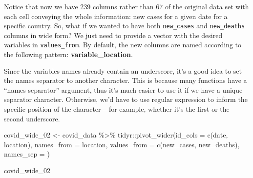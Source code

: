 \documentclass[
]{book}
\newenvironment{Shaded}{\begin{snugshade}}{\end{snugshade}}
\newcommand{\AttributeTok}[1]{\textcolor[rgb]{0.77,0.63,0.00}{#1}}
\newcommand{\FunctionTok}[1]{\textcolor[rgb]{0.00,0.00,0.00}{#1}}
\newcommand{\NormalTok}[1]{#1}
\newcommand{\OtherTok}[1]{\textcolor[rgb]{0.56,0.35,0.01}{#1}}
\newcommand{\SpecialCharTok}[1]{\textcolor[rgb]{0.00,0.00,0.00}{#1}}
\newcommand{\StringTok}[1]{\textcolor[rgb]{0.31,0.60,0.02}{#1}}
\begin{document}
Notice that now we have 239 columns rather than 67 of the original data set with each cell conveying the whole information: new cases for a given date for a specific country. So, what if we wanted to have both \texttt{new\_cases} and \texttt{new\_deaths} columns in wide form? We just need to provide a vector with the desired variables in \texttt{values\_from}. By default, the new columns are named according to the following pattern: \textbf{variable\_location}.

Since the variables names already contain an underscore, it's a good idea to set the names separator to another character. This is because many functions have a ``names separator'' argument, thus it's much easier to use it if we have a unique separator character. Otherwise, we'd have to use regular expression to inform the specific position of the character -- for example, whether it's the first or the second underscore.

\begin{Shaded}
\begin{Highlighting}[]
\NormalTok{covid\_wide\_02 }\OtherTok{\textless{}{-}}\NormalTok{ covid\_data }\SpecialCharTok{\%\textgreater{}\%} 
\NormalTok{  tidyr}\SpecialCharTok{::}\FunctionTok{pivot\_wider}\NormalTok{(}\AttributeTok{id\_cols     =} \FunctionTok{c}\NormalTok{(}\StringTok{\textquotesingle{}date\textquotesingle{}}\NormalTok{, }\StringTok{\textquotesingle{}location\textquotesingle{}}\NormalTok{), }
                     \AttributeTok{names\_from  =} \StringTok{\textquotesingle{}location\textquotesingle{}}\NormalTok{, }
                     \AttributeTok{values\_from =} \FunctionTok{c}\NormalTok{(}\StringTok{\textquotesingle{}new\_cases\textquotesingle{}}\NormalTok{, }\StringTok{\textquotesingle{}new\_deaths\textquotesingle{}}\NormalTok{),}
                     \AttributeTok{names\_sep   =} \StringTok{\textquotesingle{}{-}\textquotesingle{}}\NormalTok{)}

\NormalTok{covid\_wide\_02}
\end{Highlighting}
\end{Shaded}
\end{document}
